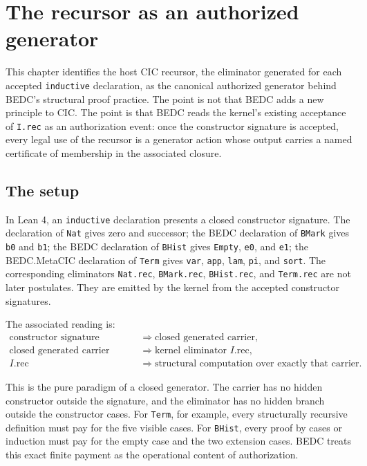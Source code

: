 \chapter{The recursor as an authorized generator}
\label{ch:recursor-as-authorized-generator}

This chapter identifies the host CIC recursor, the eliminator generated for each accepted \texttt{inductive} declaration, as the canonical authorized generator behind BEDC's structural proof practice. The point is not that BEDC adds a new principle to CIC. The point is that BEDC reads the kernel's existing acceptance of \texttt{I.rec} as an authorization event: once the constructor signature is accepted, every legal use of the recursor is a generator action whose output carries a named certificate of membership in the associated closure.

\section{The setup}
\label{sec:recursor-generator-setup}

In Lean 4, an \texttt{inductive} declaration presents a closed constructor signature. The declaration of \texttt{Nat} gives zero and successor; the BEDC declaration of \texttt{BMark} gives \texttt{b0} and \texttt{b1}; the BEDC declaration of \texttt{BHist} gives \texttt{Empty}, \texttt{e0}, and \texttt{e1}; the BEDC.MetaCIC declaration of \texttt{Term} gives \texttt{var}, \texttt{app}, \texttt{lam}, \texttt{pi}, and \texttt{sort}. The corresponding eliminators \texttt{Nat.rec}, \texttt{BMark.rec}, \texttt{BHist.rec}, and \texttt{Term.rec} are not later postulates. They are emitted by the kernel from the accepted constructor signatures.

The associated reading is:
$$
\begin{aligned}
\text{constructor signature accepted}
&\Longrightarrow \text{closed generated carrier},\\
\text{closed generated carrier}
&\Longrightarrow \text{kernel eliminator } I.\text{rec},\\
I.\text{rec}
&\Longrightarrow \text{structural computation over exactly that carrier}.
\end{aligned}
$$

This is the pure paradigm of a closed generator. The carrier has no hidden constructor outside the signature, and the eliminator has no hidden branch outside the constructor cases. For \texttt{Term}, for example, every structurally recursive definition must pay for the five visible cases. For \texttt{BHist}, every proof by cases or induction must pay for the empty case and the two extension cases. BEDC treats this exact finite payment as the operational content of authorization.

